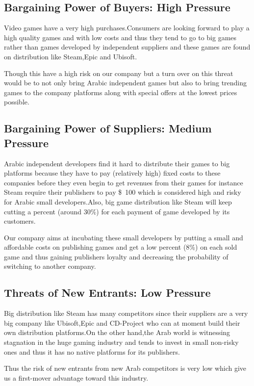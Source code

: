 \documentclass[fontsize=14pt,svgnames]{scrreprt}
\begin{document}
\subsection{Bargaining Power of Buyers: High Pressure}
 Video games have a very high purchases.Consumers are looking forward to play a high quality games and with low costs and thus they tend to go to big games rather than games developed by independent suppliers and these games are found on distribution like Steam,Epic and Ubisoft.
 \par Though this have a high risk on our company but a turn over on this threat would be to not only bring Arabic independent games but also to bring trending games to the company platforms along with special offers at the lowest prices possible.    
\subsection{Bargaining Power of Suppliers: Medium Pressure} 
Arabic independent developers find it hard to distribute their games to big platforms because they have to pay (relatively high) fixed costs to these companies before they even begin to get revenues from their games for instance Steam require their publishers to pay \SI{100}[\$]{} which is considered high and risky for Arabic small developers.Also, big game distribution like Steam will keep cutting a percent (around 30\%) for each payment of game developed by its customers.
\par Our company aims at incubating these small developers by putting a small and affordable costs on publishing games and get a low percent (8\%) on each sold game and thus gaining publishers loyalty and decreasing the probability of switching to another company.     
\subsection{Threats of New Entrants: Low Pressure}
Big distribution like Steam has many competitors since their suppliers are a very big company like Ubisoft,Epic and CD-Project who can at moment build their own distribution platforms.On the other hand,the Arab world is witnessing stagnation in the huge gaming industry and tends to invest in small non-risky ones and thus it has no native platforms for its publishers.
\par Thus the risk of new entrants from new Arab competitors is very low which give us a first-mover advantage toward this industry.
\end{document}
